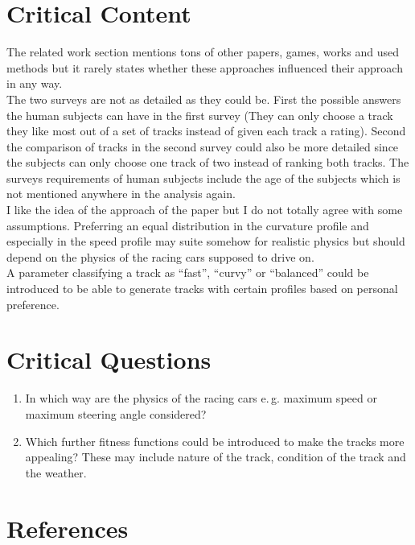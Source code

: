 \documentclass[oneside, notitlepage, twocolumn]{scrartcl}
\newcommand{\eg}{e.\,g. }
\begin{document}
\section{Critical Content}
The related work section mentions tons of other papers, games, works and used methods but it rarely states whether these approaches influenced their approach in any way.\\
The two surveys are not as detailed as they could be.
First the possible answers the human subjects can have in the first survey (They can only choose a track they like most out of a set of tracks instead of given each track a rating).
Second the comparison of tracks in the second survey could also be more detailed since the subjects can only choose one track of two instead of ranking both tracks.
The surveys requirements of human subjects include the age of the subjects which is not mentioned anywhere in the analysis again.\\
I like the idea of the approach of the paper but I do not totally agree with some assumptions.
Preferring an equal distribution in the curvature profile and especially in the speed profile may suite somehow for realistic physics but should depend on the physics of the racing cars supposed to drive on.\\
A parameter classifying a track as ``fast'', ``curvy'' or ``balanced'' could be introduced to be able to generate tracks with certain profiles based on personal preference.

\section{Critical Questions}
\begin{enumerate}
    \item In which way are the physics of the racing cars \eg maximum speed or maximum steering angle considered?
    \item Which further fitness functions could be introduced to make the tracks more appealing? These may include nature of the track, condition of the track and the weather.
\end{enumerate}

\section{References}
\begingroup
\renewcommand{\section}[2]{}%
\nocite{*}
\printbibliography%
\endgroup
\end{document}
